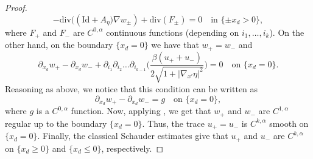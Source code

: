 \documentclass[11pt]{article}
\numberwithin{equation}{section}
\newcommand{\Id}{\mathrm{Id}}
\theoremstyle{plain}
\theoremstyle{definition}
\let\ds\displaystyle
\begin{document}
\begin{proof}
\[\ds-\text{div}\big((\Id+A_\eta\big)\nabla w_\pm)+\text{div}(F_\pm)=0\quad\text{in } \{\pm x_d>0\},\]
where $F_+$ and $F_-$ are $C^{0,\alpha}$ continuous functions (depending on $i_1,\dots,i_k$). On the other hand, on the boundary $\{x_d=0\}$ we have that $w_+=w_-$ and
\[\ds\partial_{x_d}w_+-\partial_{x_d}w_-+\partial_{i_1}\partial_{i_2}\dots\partial_{i_{k-1}}\biggl(\frac{\beta (u_++u_-)}{2\sqrt{1+|\nabla_{x'}\eta|^2}}\biggr)=0\quad\text{on }\{x_d=0\}.\]
Reasoning as above, we notice that this condition can be written as
\[\ds\partial_{x_d}w_+-\partial_{x_d}w_-=g\quad\text{on }\{x_d=0\},\]
where $g$ is a $C^{0,\alpha}$ function.
Now, applying \cite[Th.\,1.2]{D}, we get that $w_+$ and $w_-$ are $C^{1,\alpha}$ regular up to the boundary $\{x_d=0\}$.
Thus, the trace $u_+=u_-$ is $C^{k,\alpha}$ smooth on $\{x_d=0\}$. Finally, the classical Schauder estimates give that $u_+$ and $u_-$ are $C^{k,\alpha}$ on $\{x_d\ge 0\}$ and $\{x_d\le 0\}$, respectively.
\end{proof}
\end{document}
